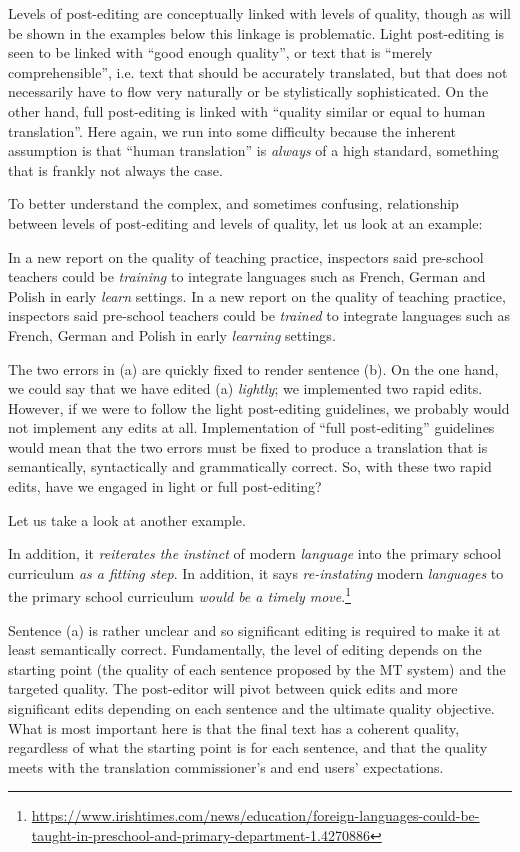 \documentclass[output=paper,colorlinks,citecolor=brown]{langscibook}
\begin{document}
Levels of post-editing are conceptually linked with levels of quality, though as will be shown in the examples below this linkage is problematic. Light post-editing is seen to be linked with “good enough quality”, or text that is “merely comprehensible”, i.e. text that should be accurately translated, but that does not necessarily have to flow very naturally or be stylistically sophisticated. On the other hand, full post-editing is linked with “quality similar or equal to human translation”. Here again, we run into some difficulty because the inherent assumption is that “human translation” is \textit{always} of a high standard, something that is frankly not always the case.

To better understand the complex, and sometimes confusing, relationship between levels of post-editing and levels of quality, let us look at an example:

\ea
\ea In a new report on the quality of teaching practice, inspectors said pre-school teachers could be \textit{training} to integrate languages such as French, German and Polish in early \textit{learn} settings.
\ex In a new report on the quality of teaching practice, inspectors said pre-school teachers could be \textit{trained} to integrate languages such as French, German and Polish in early \textit{learning} settings.
\z
\z

The two errors in (a) are quickly fixed to render sentence (b). On the one hand, we could say that we have edited (a) \textit{lightly}; we implemented two rapid edits. However, if we were to follow the light post-editing guidelines, we probably would not implement any edits at all. Implementation of “full post-editing” guidelines would mean that the two errors must be fixed to produce a translation that is semantically, syntactically and grammatically correct. So, with these two rapid edits, have we engaged in light or full post-editing?

Let us take a look at another example.

\ea
\ea In addition, it \textit{reiterates the instinct} of modern \textit{language} into the primary school curriculum \textit{as a fitting step}.
\ex In addition, it says \textit{re-instating} modern \textit{languages} to the primary school curriculum \textit{would be a timely move}.\footnote{\url{https://www.irishtimes.com/news/education/foreign-languages-could-be-taught-in-preschool-and-primary-department-1.4270886}}
\z
\z

Sentence (a) is rather unclear and so significant editing is required to make it at least semantically correct. Fundamentally, the level of editing depends on the starting point (the quality of each sentence proposed by the MT system) and the targeted quality. The post-editor will pivot between quick edits and more significant edits depending on each sentence and the ultimate quality objective. What is most important here is that the final text has a coherent quality, regardless of what the starting point is for each sentence, and that the quality meets with the translation commissioner’s and end users’ expectations. 
\end{document}
